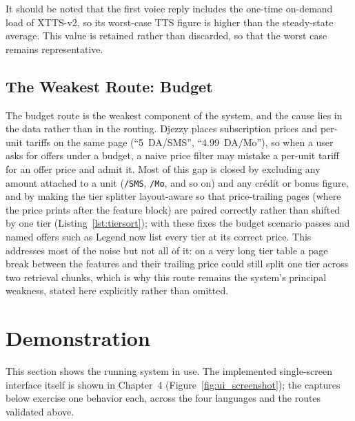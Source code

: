 \documentclass[12pt, a4paper]{report}
\newcommand{\humantext}[1]{#1}      %
\begin{document}
\humantext{It should be noted that the first voice reply includes the one-time on-demand load of XTTS-v2, so its worst-case TTS figure is higher than the steady-state average. This value is retained rather than discarded, so that the worst case remains representative.}

\subsection{The Weakest Route: Budget}
\humantext{The budget route is the weakest component of the system, and the cause lies in the data rather than in the routing. Djezzy places subscription prices and per-unit tariffs on the same page (``5~DA/SMS'', ``4.99~DA/Mo''), so when a user asks for offers under a budget, a naive price filter may mistake a per-unit tariff for an offer price and admit it. Most of this gap is closed by excluding any amount attached to a unit (\texttt{/SMS}, \texttt{/Mo}, and so on) and any crédit or bonus figure, and by making the tier splitter layout-aware so that price-trailing pages (where the price prints after the feature block) are paired correctly rather than shifted by one tier (Listing~\ref{lst:tiersort}); with these fixes the budget scenario passes and named offers such as Legend now list every tier at its correct price. This addresses most of the noise but not all of it: on a very long tier table a page break between the features and their trailing price could still split one tier across two retrieval chunks, which is why this route remains the system's principal weakness, stated here explicitly rather than omitted.}

\section{Demonstration}
\humantext{This section shows the running system in use. The implemented single-screen interface itself is shown in Chapter~4 (Figure~\ref{fig:ui_screenshot}); the captures below exercise one behavior each, across the four languages and the routes validated above.}
\end{document}
